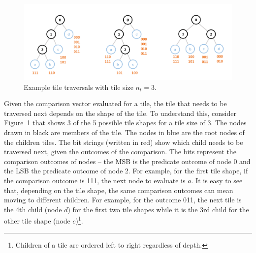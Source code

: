\begin{figure}
  \centering
  \includegraphics[width=\linewidth]{figures/TileTraversal_Size3.PNG}
  \caption{Example tile traversals with tile size $n_t=3$.}
  \label{Fig:TileTraversalTileSize3}
\end{figure}
Given the  comparison vector evaluated for a tile, the tile that needs to be traversed next depends
on the shape of the tile. To understand this, consider Figure~\ref{Fig:TileTraversalTileSize3} that 
shows 3 of the 5 possible tile shapes for a tile size of 3. The nodes drawn in black are members of the tile.
The nodes in blue are the root nodes of the children tiles.
The bit strings (written in red) show which child 
needs to be traversed next,  given the outcomes of the comparison.
The bits represent the comparison outcomes of nodes -- the MSB is the predicate outcome of node 0 and the LSB the predicate
outcome of node 2. For example, for the first tile shape, if the comparison outcome is 111, the next node to evaluate is $a$. 
It is easy to see that, depending on the tile shape, the same comparison outcomes can mean moving to different children.
For example, for the outcome 011, the next tile is the 4th child (node $d$) for the first two tile shapes while it is 
the 3rd child for the other tile shape (node $c$)\footnote{Children of a tile are ordered left to right regardless of depth.}.

